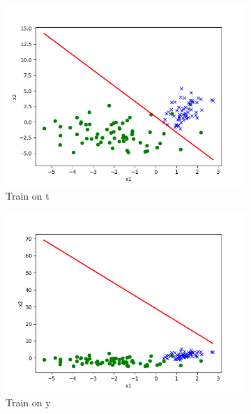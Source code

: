 \begin{answer}
\begin{figure}[htbp]
    \begin{subfigure}[b]{0.3\linewidth}
        \centering
        \includegraphics[width=\linewidth]{pics/p02c.png}
        \caption{Train on t}
    \end{subfigure}
    \begin{subfigure}[b]{0.3\linewidth}
        \centering
        \includegraphics[width=\linewidth]{pics/p02d.png}
        \caption{Train on y}
    \end{subfigure}
    \begin{subfigure}[b]{0.3\linewidth}
        \centering

\end{subfigure}
\end{figure}
\end{answer}
